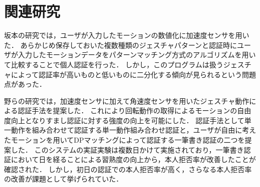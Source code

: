 \chapter{関連研究}

坂本の研究\cite{2-sakamoto}では，ユーザが入力したモーションの数値化に加速度センサを用いた．
あらかじめ保存しておいた複数種類のジェスチャパターンと認証時にユーザが入力したモーションデータをパターンマッチング方式のアルゴリズムを用いて比較することで個人認証を行った．
しかし，このプログラムは扱うジェスチャによって認証率が高いものと低いものに二分化する傾向が見られるという問題点があった．

野らの研究\cite{2-hamano}では，加速度センサに加えて角速度センサを用いたジェスチャ動作による認証手法を提案した．
これにより回転動作の取得によるモーションの自由度向上となりすまし認証に対する強度の向上を可能にした．
認証手法として単一動作を組み合わせて認証する単一動作組み合わせ認証と，ユーザが自由に考えたモーションを用いてDPマッチングによって認証する一筆書き認証の二つを提案した．
このシステムの実証実験は複数日かけて実施されており，一筆書き認証において日を経ることによる習熟度の向上から，本人拒否率が改善したことが確認された．
しかし，初日の認証での本人拒否率が高く，さらなる本人拒否率の改善が課題として挙げられていた．
